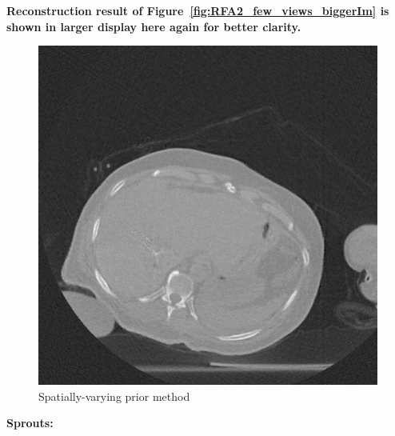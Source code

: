 \documentclass{article}
\begin{document}
\newpage
\textbf{Reconstruction result of Figure~\ref{fig:RFA2_few_views_biggerIm} is shown in larger display here  again for better clarity.}\\
\begin{figure}[!h]
\centering
\includegraphics[width=1.2\columnwidth]{../images/tmh/RFA2/few_views/weighted_pca_all_methods_kk_0_01.png}
\captionsetup{labelformat=empty}
\caption[Representative results-2]{\large{Spatially-varying prior method}}
\label{fig:RFA2_few_views_bigger}
\end{figure}
\newpage

\textbf{Sprouts:}
\end{document}

